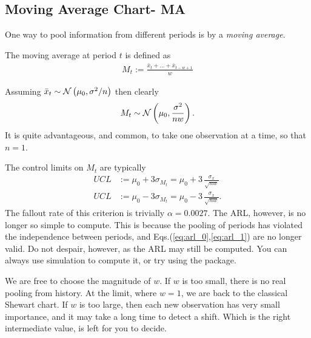 \subsection{Moving Average Chart- MA}
One way to pool information from different periods is by a \emph{moving average}.
\begin{definition}
The moving average at period $t$ is defined as
\begin{align}
	M_t:= \frac{\bar{x}_t+\dots+\bar{x}_{t-w+1}}{w}
\end{align}
\end{definition}
Assuming $\bar{x}_t \sim \mathcal{N}\left(\mu_0, \sigma^2/n\right)$ then clearly 
\begin{align}
	M_t \sim \mathcal{N}\left(\mu_0, \frac{\sigma^2}{nw}\right).
\end{align}
It is quite advantageous, and common, to take one observation at a time, so that $n=1$.

The control limits on $M_t$ are typically
\begin{align}
	UCL &:= \mu_0 + 3 \sigma_{M_t}= \mu_0 + 3 \, \frac{\sigma_x}{\sqrt{nw}} \\
	UCL &:= \mu_0 - 3 \sigma_{M_t}= \mu_0 - 3 \, \frac{\sigma_x}{\sqrt{nw}}.
\end{align}
The fallout rate of this criterion is trivially $\alpha=0.0027$. 
The ARL, however, is no longer so simple to compute. 
This is because the pooling of periods has violated the independence between periods, and Eqs.(\ref{eq:arl_0},\ref{eq:arl_1}) are no longer valid. 
Do not despair, however, as the ARL may still be computed. 
You can always use simulation to compute it, or try using the  \R package.




We are free to choose the magnitude of $w$. If $w$ is too small, there is no real pooling from history. At the limit, where $w=1$, we are back to the classical Shewart chart. 
If $w$ is too large, then each new observation has very small importance, and it may take a long time to detect a shift.
Which is the right intermediate value, is left for you to decide.






